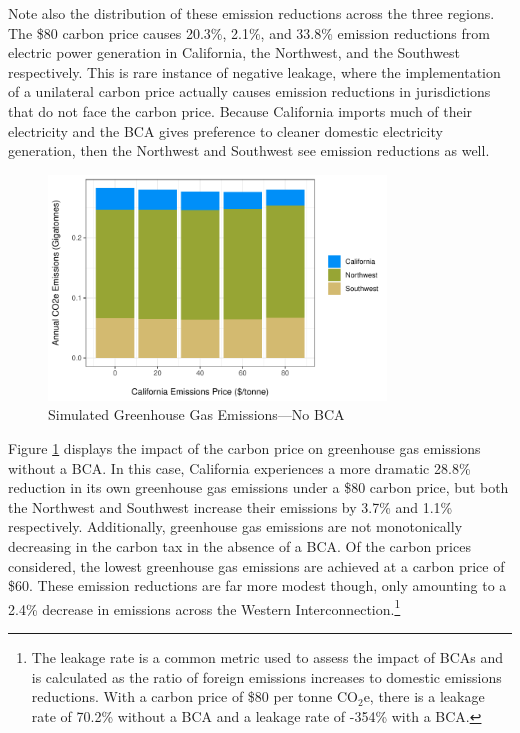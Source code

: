 Note also the distribution of these emission reductions across the three regions. The \$80 carbon price causes 20.3\%, 2.1\%, and 33.8\% emission reductions from electric power generation in California, the Northwest, and the Southwest respectively. This is rare instance of negative leakage, where the implementation of a unilateral carbon price actually causes emission reductions in jurisdictions that do not face the carbon price. Because California imports much of their electricity and the BCA gives preference to cleaner domestic electricity generation, then the Northwest and Southwest see emission reductions as well. 

\begin{figure}
    \centering
    \caption{Simulated Greenhouse Gas Emissions---No BCA\label{sim_co2e_nobca}}
    \includegraphics[width=0.8\textwidth]{figures/chapter5_figures/sim_co2e_nobca.pdf}
\end{figure}

Figure \ref{sim_co2e_nobca} displays the impact of the carbon price on greenhouse gas emissions without a BCA. In this case, California experiences a more dramatic 28.8\% reduction in its own greenhouse gas emissions under a \$80 carbon price, but both the Northwest and Southwest increase their emissions by 3.7\% and 1.1\% respectively. Additionally, greenhouse gas emissions are not monotonically decreasing in the carbon tax in the absence of a BCA. Of the carbon prices considered, the lowest greenhouse gas emissions are achieved at a carbon price of \$60. These emission reductions are far more modest though, only amounting to a 2.4\% decrease in emissions across the Western Interconnection.\footnote{The leakage rate is a common metric used to assess the impact of BCAs and is calculated as the ratio of foreign emissions increases to domestic emissions reductions. With a carbon price of \$80 per tonne CO$_2$e, there is a leakage rate of 70.2\% without a BCA and a leakage rate of -354\% with a BCA.}

